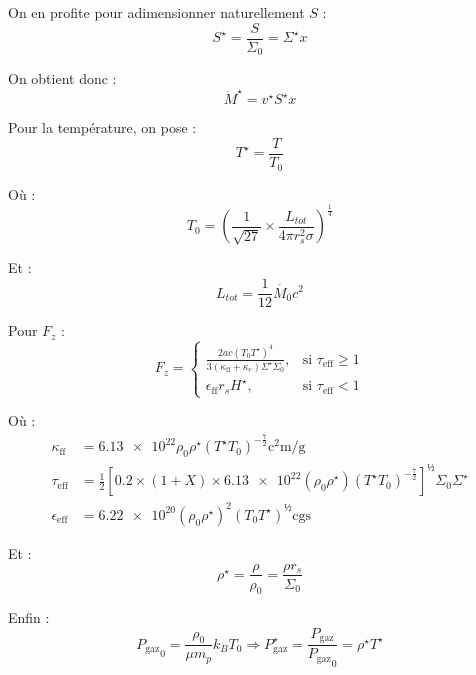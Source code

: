 On en profite pour adimensionner naturellement $S$ :
\begin{equation}
    S^\star = \frac{S}{\Sigma_0} = \Sigma^\star x
\end{equation}

On obtient donc :
\begin{equation}
    \dot{M}^\star = v^\star S^\star x
\end{equation}

Pour la température, on pose :
\begin{equation}
    T^{\star} = \frac{T}{T_0}
\end{equation}

Où :
\begin{equation}
    T_0 = \left(\frac{1}{\sqrt{27}} \times \frac{L_{tot}}{4 \pi r_s^2 \sigma} \right)^{\frac{1}{4}}
\end{equation}

Et :
\begin{equation}
    L_{tot} = \frac{1}{12} \dot{M_0} c^2
\end{equation}

Pour $F_z$ :
\begin{equation}
    F_z =
    \begin{cases}
        \frac{2 a c \left(T_0 T^\star\right)^4}{3 (\kappa_\mathrm{ff} + \kappa_e)\Sigma^\star \Sigma_0}, &\text{si $\tau_\mathrm{eff} \geq 1$} \\
        \epsilon_\mathrm{ff} r_s H^\star, &\text{si $\tau_\mathrm{eff} < 1$}
    \end{cases}
\end{equation}

Où :
\begin{align}
    \kappa_\mathrm{ff} &= \num{6.13e22} \rho_0 \rho^\star \left(T^\star T_0\right)^{-\frac{7}{2}} \si{\square\centi\meter\per\gram} \\
    \tau_\mathrm{eff} &= \frac{1}{2} \left[ \num{0.2} \times (1 + X) \times \num{6.13e22} \left(\rho_0 \rho^\star\right) \left(T^\star T_0\right)^{-\frac{7}{2}} \right]^½ \Sigma_0 \Sigma^\star \\
    \epsilon_\mathrm{eff} &= \num{6.22e20} (\rho_0 \rho^\star)^2 (T_0 T^\star)^½ \text{cgs}
\end{align}

Et :
\begin{equation}
    \rho^\star = \frac{\rho}{\rho_0} = \frac{\rho r_s}{\Sigma_0}
\end{equation}

Enfin :
\begin{equation}
    {P_\mathrm{gaz}}_0 = \frac{\rho_0}{\mu m_p} k_B T_0 \Rightarrow P_\mathrm{gaz}^\star = \frac{P_\mathrm{gaz}}{{P_\mathrm{gaz}}_0} = \rho^\star T^\star
\end{equation}

